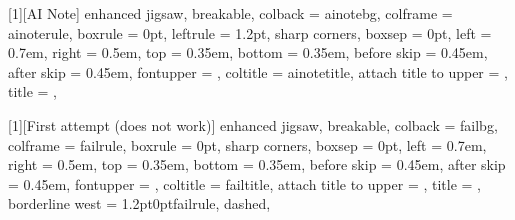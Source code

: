 [1][AI Note]{%
  enhanced jigsaw,
  breakable,
  colback   = ainotebg,
  colframe  = ainoterule,
  boxrule   = 0pt,
  leftrule  = 1.2pt,
  sharp corners,
  boxsep    = 0pt,
  left      = 0.7em,
  right     = 0.5em,
  top       = 0.35em,
  bottom    = 0.35em,
  before skip = 0.45em,
  after skip  = 0.45em,
  fontupper = \small,
  coltitle  = ainotetitle,
  attach title to upper = {\hspace{0.4em}},
  title     = {},
}

\newcommand{\ainoteinline}[1]{{\small\color{ainotetitle}\prooffont{AI Note:} #1}}


[1][First attempt (does not work)]{%
  enhanced jigsaw,
  breakable,
  colback   = failbg,
  colframe  = failrule,
  boxrule   = 0pt,
  sharp corners,
  boxsep    = 0pt,
  left      = 0.7em,
  right     = 0.5em,
  top       = 0.35em,
  bottom    = 0.35em,
  before skip = 0.45em,
  after skip  = 0.45em,
  fontupper = \small,
  coltitle  = failtitle,
  attach title to upper = {\hspace{0.4em}},
  title     = {},
  borderline west = {1.2pt}{0pt}{failrule, dashed},
}
